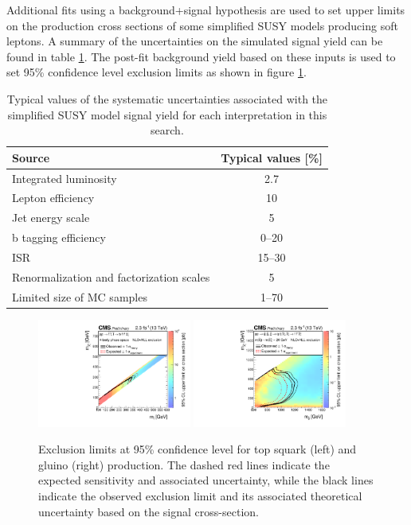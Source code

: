 Additional fits using a background+signal hypothesis are used to set upper limits on the production cross sections of some simplified SUSY models producing soft leptons. A summary of the uncertainties on the simulated signal yield can be found in table \ref{tbl:softsignalSyst}. The post-fit background yield based on these inputs is used to set 95\% confidence level exclusion limits as shown in figure \ref{fig:softlimits}.

\begin{table}
	\centering
	\begin{tabular}{l|c}
\hline
Source & Typical values [\%]  \\
\hline
Integrated luminosity & 2.7  \\
Lepton efficiency & 10  \\
Jet energy scale & 5  \\
b tagging efficiency & 0--20  \\
ISR & 15--30  \\
Renormalization  and factorization scales & 5  \\
Limited size of MC samples & 1--70  \\
\hline
\end{tabular}
	\caption{Typical values of the systematic uncertainties associated with the simplified SUSY model signal yield for each interpretation in this search.}
	\label{tbl:softsignalSyst}
\end{table}
\begin{figure}
	\centering
	\includegraphics[width=0.45\textwidth]{soft/figs/T2-4bdXSEC}
	\includegraphics[width=0.45\textwidth]{soft/figs/T5qqqqWWXSEC}
	\caption{Exclusion limits at 95\% confidence level for top squark (left) and gluino (right) production. The dashed red lines indicate the expected sensitivity and associated uncertainty, while the black lines indicate the observed exclusion limit and its associated theoretical uncertainty based on the signal cross-section.}
	\label{fig:softlimits}
\end{figure}

